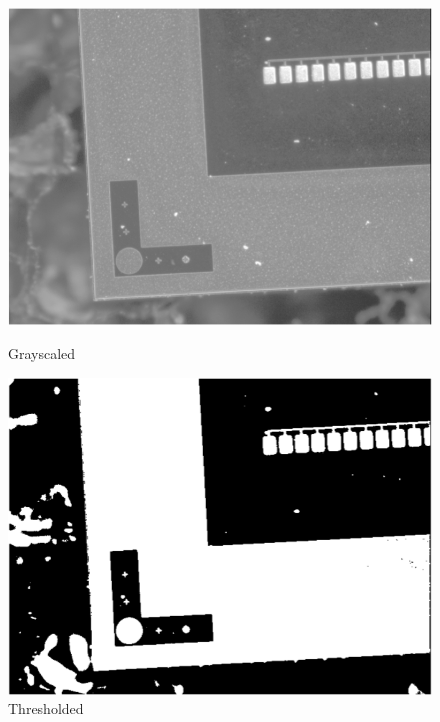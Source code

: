 \documentclass[fleqn,10pt]{SelfArx} %
\begin{document}
\begin{figure}[!tbp]
  \centering
  \begin{minipage}[b]{0.23\textwidth}
    \includegraphics[width=\textwidth]{grayscaledmarker.png}
    \caption{Grayscaled}
    \label{fig:grayscaledmarker}
  \end{minipage}
  \begin{minipage}[b]{0.23\textwidth}
    \includegraphics[width=\textwidth]{thresholdedmarker.png}
    \caption{Thresholded}
        \label{fig:thresholdedmarker}
  \end{minipage}
\end{figure}
\end{document}
